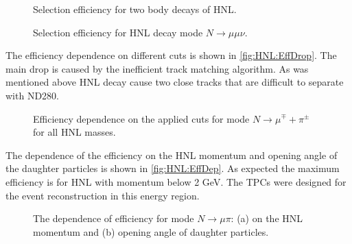 \documentclass[../main.tex]{subfiles}
\begin{document}
\begin{figure}[!ht]
  \begin{minipage}{0.49\linewidth}
  \end{minipage}
  \hfill
  \begin{minipage}{0.49\linewidth}
  \end{minipage}
  \caption{Selection efficiency for two body decays of HNL.}
  \label{fig:HNL:Eff1}
\end{figure}

\begin{figure}[!ht]
  \caption{Selection efficiency for HNL decay mode $N\to\mu\mu\nu$.}
  \label{fig:HNL:Eff2}
\end{figure}

The efficiency dependence on different cuts is shown in \autoref{fig:HNL:EffDrop}. The main drop is caused by the inefficient track matching algorithm. As was mentioned above HNL decay cause two close tracks that are difficult to separate with ND280.

\begin{figure}[!ht]
  \caption{Efficiency dependence on the applied cuts for mode $N\to\mu^\mp+\pi^\pm$ for all HNL masses.}
  \label{fig:HNL:EffDrop}
\end{figure}

The dependence of the efficiency on the HNL momentum and opening angle of the daughter particles is shown in \autoref{fig:HNL:EffDep}. As expected the maximum efficiency is for HNL with momentum below 2 GeV. The TPCs were designed for the event reconstruction in this energy region.
\begin{figure}[!ht]
  \begin{minipage}{0.49\linewidth}
  \end{minipage}
  \hfill
  \begin{minipage}{0.49\linewidth}
  \end{minipage}
  \caption{The dependence of efficiency for mode $N\to\mu\pi$: (a) on the HNL momentum and (b) opening angle of daughter particles.}
  \label{fig:HNL:EffDep}
\end{figure}
\end{document}
